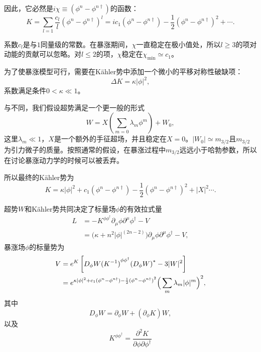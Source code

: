因此，它必然是$i\chi \equiv (\phi^n - \phi^{n\dagger})$的函数：
\begin{equation}
    K = \sum_{l=1}\frac{c_l}{l}{\left(\phi^n-\phi^{n\dagger}\right)}^l
    =
    i c_1(\phi^n-\phi^{n\dagger})-\frac{1}{2}{\left(\phi^n-\phi^{n\dagger}\right)}^2+\cdots.
\end{equation}

系数$c_l$是与$1$同量级的常数。在暴涨期间，$\chi$一直稳定在极小值处，所以$l\ge
3$的项对动能的贡献可以忽略\citep{takahashi2010linear}。对$l\le2$的项，$\chi$稳定在$\chi_{\text{min}}\simeq
c_1$。

为了使暴涨模型可行，需要在K\"ahler势中添加一个微小的平移对称性破缺项：
\begin{equation}
    \Delta{K} = \kappa \left|\phi\right|^2,
\end{equation}
系数满足条件$0< \kappa \ll 1$。

与\citep{nakayama2010running}不同，我们假设超势满足一个更一般的形式\citep{nakayama2013polynomial,kawasaki2000natural,kawasaki2001natural,kallosh2010new,kallosh2011general}
\begin{equation}
    W = X\left(\sum_{m=0}\lambda_m\phi^m\right)+W_0,
\end{equation}
这里$\lambda_m\ll
1$，$X$是一个额外的手征超场，并且稳定在$X=0$。$\left|W_0\right|\simeq
m_{3/2}$且$m_{3/2}$为引力微子的质量。按照通常的假设，在暴涨过程中$m_{3/2}$远远小于哈勃参数，所以在讨论暴涨动力学的时候可以被丢弃。

所以最终的K\"ahler势为
\begin{equation}
    K = \kappa |\phi|^2 + c_1(\phi^n-\phi^{n\dagger}) -
    \frac{1}{2}{(\phi^n-\phi^{n\dagger})}^2 + |X|^2\cdots.
\end{equation}

超势$W$和K\"ahler势共同决定了标量场$\phi$的有效拉式量
\begin{equation}
\begin{split}\label{eq:lagrangian-with-running-kinetic-term}
L &= -K^{\phi\phi^\dagger} \partial_\mu\phi\partial^\mu\phi^\dagger
- V \\
  & = \big(\kappa + n^2|\phi|^{(2n-2)}\big)
  \partial_\mu \phi \partial^\mu \phi^\dagger - V,
\end{split}
\end{equation}
暴涨场$\phi$的标量势为
\begin{align}
V &= e^K \left[
    D_\phi W{(K^{-1})}^{\phi\phi^\dagger}{(D_\phi W)}^{*} - 3|W|^2 
    \right]\notag \\
  &=
  e^{\kappa|\phi|^2+c_1(\phi^n-\phi^{n\dagger})-\frac{1}{2}{(\phi^n-\phi^{n\dagger})}^2}
  {\Big(\sum_m \lambda_m|\phi|^m\Big)}^2,
\end{align}
其中
\begin{equation}
    D_\phi W = \partial_\phi W + (\partial_\phi K) W,
\end{equation}
以及
\begin{equation}
    K^{\phi\phi^\dagger} = \frac{\partial^2 K}{\partial\phi
    \partial\phi^\dagger}
\end{equation}

